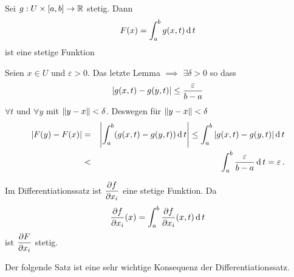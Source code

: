 \begin{Kor}
  Sei $g:U\times [a,b]\rightarrow\mathbb{R}$ stetig. Dann
  \[F(x)=\int_a^bg(x,t)\operatorname{d} t\]
  ist eine stetige Funktion
\end{Kor}
\begin{Bew}
  Seien $x\in U$ und $\varepsilon >0$. Das letzte Lemma $\implies$ $\exists \delta >0$ so dass
  \[\left| g(x,t)-g(y,t) \right|\leq \frac{\varepsilon}{b-a}\]
  $\forall t$ und $\forall y$ mit $\left\| y-x \right\|<\delta$. Deswegen für $\left\| y-x \right\|<\delta$
  \begin{eqnarray*}
\left| F(y)-F(x) \right|&=&\left| \int_a^b(g(x,t)-g(y,t))\operatorname{d} t \right|
\leq\int_a^b\left| g(x,t)-g(y,t) \right|\operatorname{d} t\\
  &<&\int_a^b\frac{\varepsilon}{b-a}\operatorname{d} t=\varepsilon\, .
\end{eqnarray*}
\end{Bew}
\begin{Bem}
  Im Differentiationssatz ist $\dfrac{\partial f}{\partial x_i}$ eine stetige Funktion. Da
  \[\dfrac{\partial f}{\partial x_i}(x)=\int_a^b\dfrac{\partial f}{\partial x_i}(x,t)\operatorname{d} t\]
  ist $\dfrac{\partial F}{\partial x_i}$ stetig.
\end{Bem}

  Der folgende Satz ist eine sehr wichtige Konsequenz der Differentiationssatz.